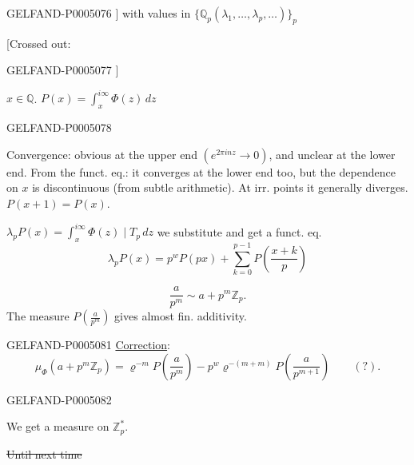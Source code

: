 \begin{GelfandAdjacentEvidence}{GELFAND-P000507}{6}
]
with values in $\{\mathbb Q_p(\lambda_1,\ldots,\lambda_p,\ldots)\}_p$

[Crossed out: 
\end{GelfandAdjacentEvidence}
\begin{GelfandAdjacentEvidence}{GELFAND-P000507}{7}
]

$x\in\mathbb Q$.\qquad
$P(x)=\displaystyle\int_x^{i\infty}\Phi(z)\,dz$
\end{GelfandAdjacentEvidence}
\begin{GelfandAdjacentEvidence}{GELFAND-P000507}{8}


Convergence: obvious at the upper end $(e^{2\pi inz}\to0)$, and unclear at the lower end.
From the funct. eq.: it converges at the lower end too, but the dependence on $x$ is discontinuous (from subtle arithmetic).
At irr. points it generally diverges. $P(x+1)=P(x)$.

$\lambda_pP(x)=\displaystyle\int_x^{i\infty}\Phi(z)\mid T_p\,dz$
we substitute and get a funct. eq.
\[
\lambda_pP(x)=p^wP(px)+\sum_{k=0}^{p-1}P\left(\frac{x+k}{p}\right)
\]
\end{GelfandAdjacentEvidence}

\[
\frac{a}{p^m}\sim a+p^m\mathbb Z_p.
\]
The measure $P\left(\frac{a}{p^m}\right)$ gives almost fin. additivity.


\begin{GelfandAdjacentEvidence}{GELFAND-P000508}{1}
\uline{Correction}:
\[
\mu_\Phi(a+p^m\mathbb Z_p)=
\varrho^{-m}P\left(\frac{a}{p^m}\right)
-p^w\varrho^{-(m+m)}P\left(\frac{a}{p^{m+1}}\right)\qquad (?).
\]
\end{GelfandAdjacentEvidence}
\begin{GelfandAdjacentEvidence}{GELFAND-P000508}{2}


We get a measure on $\mathbb Z_p^*$.

\sout{Until next time}
\end{GelfandAdjacentEvidence}


